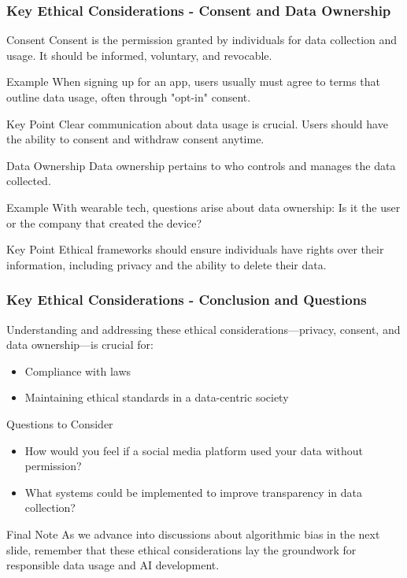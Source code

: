 \documentclass[aspectratio=169]{beamer}
\begin{document}
\begin{frame}[fragile]
    \frametitle{Key Ethical Considerations - Consent and Data Ownership}
    \begin{block}{Consent}
        Consent is the permission granted by individuals for data collection and usage. It should be informed, voluntary, and revocable.
    \end{block}
    \begin{exampleblock}{Example}
        When signing up for an app, users usually must agree to terms that outline data usage, often through "opt-in" consent.
    \end{exampleblock}
    \begin{block}{Key Point}
        Clear communication about data usage is crucial. Users should have the ability to consent and withdraw consent anytime.
    \end{block}

    \begin{block}{Data Ownership}
        Data ownership pertains to who controls and manages the data collected. 
    \end{block}
    \begin{exampleblock}{Example}
        With wearable tech, questions arise about data ownership: Is it the user or the company that created the device?
    \end{exampleblock}
    \begin{block}{Key Point}
        Ethical frameworks should ensure individuals have rights over their information, including privacy and the ability to delete their data.
    \end{block}
\end{frame}

\begin{frame}[fragile]
    \frametitle{Key Ethical Considerations - Conclusion and Questions}
    Understanding and addressing these ethical considerations—privacy, consent, and data ownership—is crucial for:
    \begin{itemize}
        \item Compliance with laws
        \item Maintaining ethical standards in a data-centric society
    \end{itemize}
    
    \begin{block}{Questions to Consider}
        \begin{itemize}
            \item How would you feel if a social media platform used your data without permission?
            \item What systems could be implemented to improve transparency in data collection?
        \end{itemize}
    \end{block}

    \begin{block}{Final Note}
        As we advance into discussions about algorithmic bias in the next slide, remember that these ethical considerations lay the groundwork for responsible data usage and AI development.
    \end{block}
\end{frame}
\end{document}
